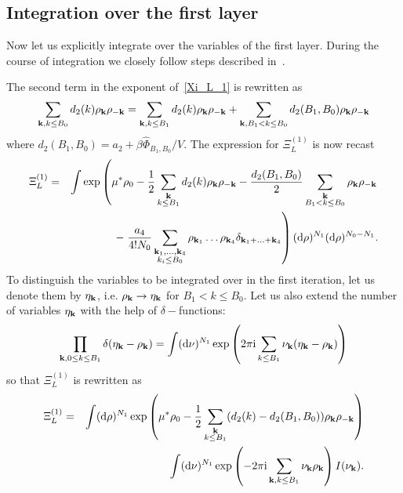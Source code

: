 \subsection{Integration over the first layer}
Now let us explicitly integrate over the variables of the first layer. During the course of integration we closely follow steps described in~\cite{MpkCMP2005}.

The second term in the exponent of~\eqref{Xi_L_1} is rewritten as
\begin{equation*}
	\sum_{\substack{\vb k, k \leq B_0}} d_2(k) \rho_{\vb k} \rho_{-\vb k} 
	= 
	\sum_{\substack{\vb k, k \leq B_1}} d_2(k) \rho_{\vb k} \rho_{-\vb k}
	+
	\sum_{\substack{\vb k, B_1 < k \leq B_0}} d_2(B_1, B_0) \rho_{\vb k} \rho_{-\vb k}
\end{equation*}
where $d_2(B_1, B_0) = a_2 + \beta\hat{\Phi}_{B_1, B_0}/V$.
The expression for $\Xi_L^{(1)}$ is now recast
\begin{eqnarray*}
	\Xi_L^{(1)} &=& 
	\int \exp\left(
	\mu^* \rho_0 - \frac{1}{2} \sum_{\substack{\vb k \\ k \leq B_1}} d_2(k) \rho_{\vb k} \rho_{-\vb k}
	- \frac{d_2(B_1, B_0)}{2} \sum_{\substack{\vb k \\ B_1 < k \leq B_0}} \rho_{\vb k} \rho_{-\vb k}  
	\right.
	\\
	&& -\left. \frac{a_4}{4! N_0} \sum_{\substack{\vb k_1, \dotsc, \vb k_4 \\ k_i \leq B_0}} \rho_{\vb k_1} \dotsc \rho_{\vb k_4} \delta_{\vb{k}_1 + \dotsc + \vb{k}_4} \right) 
	({\rm d} \rho)^{N_1} ({\rm d} \rho)^{N_0 - N_1}
	\nonumber.
\end{eqnarray*}
To distinguish the variables to be integrated over in the first iteration, let us denote them by $\eta_{\vb k}$, i.e. $\rho_{\vb k} \rightarrow \eta_{\vb k}$ for $B_1 < k \leq B_0$. Let us also extend the number of variables $\eta_{\vb k}$ with the help of $\delta-$functions:
\begin{equation*}
	\prod_{\vb{k}, 0\leq k \leq B_1}\delta(\eta_{\vb k}-\rho_{\vb k})
	= \int ({\rm d}\nu)^{N_1}\exp \left(2\pi{\rm i}\sum_{k\leq B_1}\nu_{\vb k}(\eta_{\vb k}-\rho_{\vb k})\right)
\end{equation*}
so that $\Xi_L^{(1)}$ is rewritten as 
\begin{eqnarray*}
	\Xi_L^{(1)} &=& 
	\int ({\rm d} \rho)^{N_1} \exp 
	\left(
		\mu^* \rho_0 - \frac{1}{2} \sum_{\substack{\vb k \\ k \leq B_1}} (d_2(k) - d_2(B_1, B_0) ) \rho_{\vb k} \rho_{-\vb k}
	\right)
	\\
	&&  \int ({\rm d}\nu)^{N_1} \exp \left(-2\pi{\rm i}\sum_{\vb k, k \leq B_1} \nu_{\vb k}\rho_{\vb k}\right)
	I(\nu_{\vb k}).
\end{eqnarray*}
